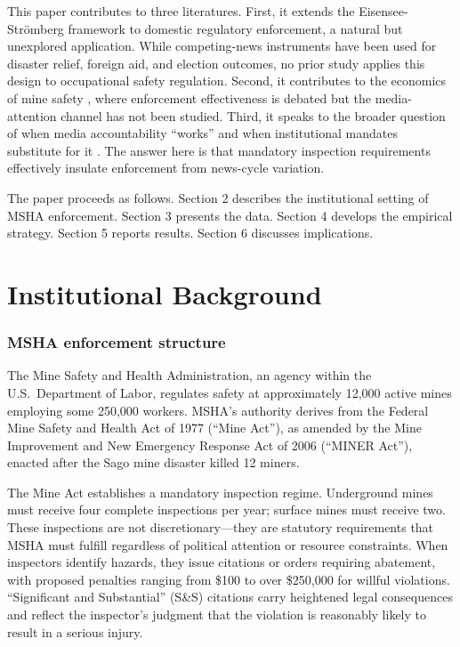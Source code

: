 \documentclass[12pt]{article}
\begin{document}
This paper contributes to three literatures. First, it extends the Eisensee-Str\"{o}mberg framework to domestic regulatory enforcement, a natural but unexplored application. While competing-news instruments have been used for disaster relief, foreign aid, and election outcomes, no prior study applies this design to occupational safety regulation. Second, it contributes to the economics of mine safety \citep{gowrisankaran2015msha, morantz2013coal, gray1987decline}, where enforcement effectiveness is debated but the media-attention channel has not been studied. Third, it speaks to the broader question of when media accountability ``works'' and when institutional mandates substitute for it \citep{prat2013political, besley2006handcuffs}. The answer here is that mandatory inspection requirements effectively insulate enforcement from news-cycle variation.

The paper proceeds as follows. Section 2 describes the institutional setting of MSHA enforcement. Section 3 presents the data. Section 4 develops the empirical strategy. Section 5 reports results. Section 6 discusses implications.


\section{Institutional Background}

\subsubsection*{MSHA enforcement structure} The Mine Safety and Health Administration, an agency within the U.S.\ Department of Labor, regulates safety at approximately 12,000 active mines employing some 250,000 workers. MSHA's authority derives from the Federal Mine Safety and Health Act of 1977 (``Mine Act''), as amended by the Mine Improvement and New Emergency Response Act of 2006 (``MINER Act''), enacted after the Sago mine disaster killed 12 miners.

The Mine Act establishes a mandatory inspection regime. Underground mines must receive four complete inspections per year; surface mines must receive two. These inspections are not discretionary---they are statutory requirements that MSHA must fulfill regardless of political attention or resource constraints. When inspectors identify hazards, they issue citations or orders requiring abatement, with proposed penalties ranging from \$100 to over \$250,000 for willful violations. ``Significant and Substantial'' (S\&S) citations carry heightened legal consequences and reflect the inspector's judgment that the violation is reasonably likely to result in a serious injury.
\end{document}
